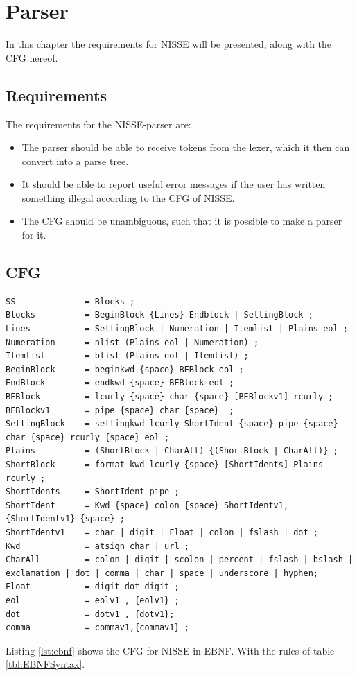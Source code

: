 \chapter{Parser}

In this chapter the requirements for NISSE will be presented, along with the CFG hereof.

\section{Requirements}
The requirements for the NISSE-parser are:
\begin{itemize}
	\item The parser should be able to receive tokens from the lexer, which it then can convert into a parse tree.
	\item It should be able to report useful error messages if the user has written something illegal according to the CFG of NISSE.
	\item The CFG should be unambiguous, such that it is possible to make a parser for it. 
\end{itemize}

\newpage
\section{CFG}
\begin{lstlisting}[frame=single, caption={CFG of NISSE in EBNF.}, label={lst:ebnf}, language=NISSE]
SS              = Blocks ;
Blocks          = BeginBlock {Lines} Endblock | SettingBlock ;
Lines           = SettingBlock | Numeration | Itemlist | Plains eol ;
Numeration      = nlist (Plains eol | Numeration) ;
Itemlist        = blist (Plains eol | Itemlist) ;
BeginBlock      = beginkwd {space} BEBlock eol ;
EndBlock        = endkwd {space} BEBlock eol ;
BEBlock         = lcurly {space} char {space} [BEBlockv1] rcurly ;
BEBlockv1       = pipe {space} char {space}  ;
SettingBlock    = settingkwd lcurly ShortIdent {space} pipe {space} char {space} rcurly {space} eol ;
Plains          = (ShortBlock | CharAll) {(ShortBlock | CharAll)} ;
ShortBlock      = format_kwd lcurly {space} [ShortIdents] Plains rcurly ;
ShortIdents     = ShortIdent pipe ;
ShortIdent      = Kwd {space} colon {space} ShortIdentv1,{ShortIdentv1} {space} ;
ShortIdentv1    = char | digit | Float | colon | fslash | dot ;
Kwd             = atsign char | url ;
CharAll         = colon | digit | scolon | percent | fslash | bslash | exclamation | dot | comma | char | space | underscore | hyphen;
Float           = digit dot digit ; 
eol             = eolv1 , {eolv1} ;
dot             = dotv1 , {dotv1};
comma           = commav1,{commav1} ;
\end{lstlisting}
Listing \ref{lst:ebnf} shows the CFG for NISSE in EBNF. With the rules of table \ref{tbl:EBNFSyntax}.

